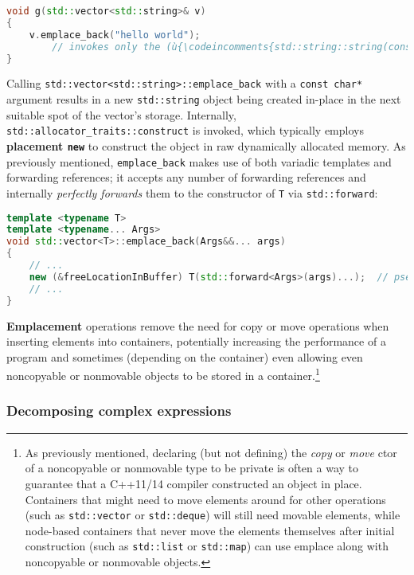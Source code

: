 \begin{lstlisting}[language=C++]
void g(std::vector<std::string>& v)
{
    v.emplace_back("hello world");
        // invokes only the (ù{\codeincomments{std::string::string(const char*)}}ù) constructor
}
\end{lstlisting}
    
\noindent Calling \texttt{std::vector<std::string>::emplace\_back} with a
\texttt{const}~\texttt{char*} argument results in a new
\texttt{std::string} object being created in-place in the next suitable
spot of the vector's storage. Internally,
\texttt{std::allocator\_traits::construct} is invoked, which typically
employs \textbf{placement \texttt{new}} to construct the object in raw
dynamically allocated memory. As previously mentioned,
\texttt{emplace\_back} makes use of both variadic
templates and forwarding references; it accepts any
number of forwarding references and internally \textit{perfectly forwards} them
to the constructor of \texttt{T} via \texttt{std::forward}:

\begin{lstlisting}[language=C++]
template <typename T>
template <typename... Args>
void std::vector<T>::emplace_back(Args&&... args)
{
    // ...
    new (&freeLocationInBuffer) T(std::forward<Args>(args)...);  // pseudocode
    // ...
}
\end{lstlisting}
    
\noindent \textbf{Emplacement} operations remove the need for copy or move
operations when inserting elements into containers, potentially
increasing the performance of a program and sometimes (depending on the
container) even allowing even noncopyable or nonmovable objects to be stored
in a container.\footnote{As previously mentioned,
declaring (but not defining) the \emph{copy} or \emph{move} ctor of a
noncopyable or nonmovable type to be private is often a way to guarantee that
a C++11/14 compiler constructed an object in place.
Containers that might need to move elements around for other operations
(such as \texttt{std::vector} or \texttt{std::deque}) will still need
movable elements, while node-based containers that never move the
elements themselves after initial construction (such as
\texttt{std::list} or \texttt{std::map}) can use emplace along with
noncopyable or nonmovable objects.}

\subsubsection[Decomposing complex expressions]{Decomposing complex expressions}\label{decomposing-complex-expressions}

